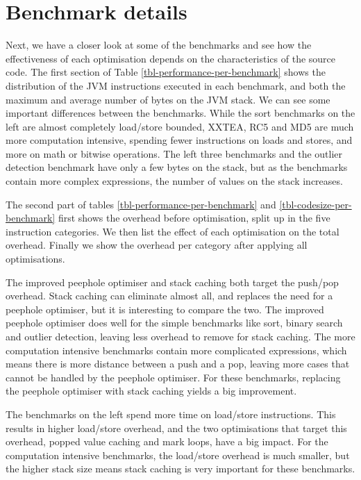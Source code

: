 \section{Benchmark details}
Next, we have a closer look at some of the benchmarks and see how the effectiveness of each optimisation depends on the characteristics of the source code. The first section of Table \ref{tbl-performance-per-benchmark} shows the distribution of the JVM instructions executed in each benchmark, and both the maximum and average number of bytes on the JVM stack. We can see some important differences between the benchmarks. While the sort benchmarks on the left are almost completely load/store bounded, XXTEA, RC5 and MD5 are much more computation intensive, spending fewer instructions on loads and stores, and more on math or bitwise operations. The left three benchmarks and the outlier detection benchmark have only a few bytes on the stack, but as the benchmarks contain more complex expressions, the number of values on the stack increases.

The second part of tables \ref{tbl-performance-per-benchmark} and \ref{tbl-codesize-per-benchmark} first shows the overhead before optimisation, split up in the five instruction categories. We then list the effect of each optimisation on the total overhead. Finally we show the overhead per category after applying all optimisations.

The improved peephole optimiser and stack caching both target the push/pop overhead. Stack caching can eliminate almost all, and replaces the need for a peephole optimiser, but it is interesting to compare the two. The improved peephole optimiser does well for the simple benchmarks like sort, binary search and outlier detection, leaving less overhead to remove for stack caching. The more computation intensive benchmarks contain more complicated expressions, which means there is more distance between a push and a pop, leaving more cases that cannot be handled by the peephole optimiser. For these benchmarks, replacing the peephole optimiser with stack caching yields a big improvement.

The benchmarks on the left spend more time on load/store instructions. This results in higher load/store overhead, and the two optimisations that target this overhead, popped value caching and mark loops, have a big impact. For the computation intensive benchmarks, the load/store overhead is much smaller, but the higher stack size means stack caching is very important for these benchmarks.

